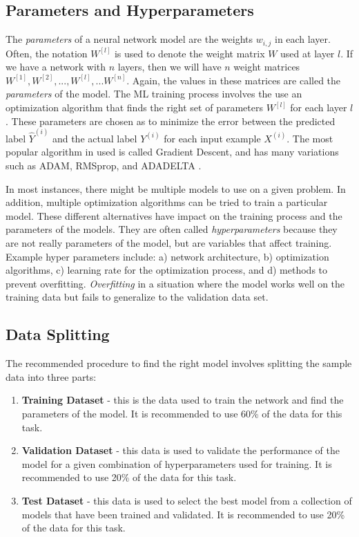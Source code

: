\documentclass[12pt]{report}
\begin{document}
\subsection{Parameters and Hyperparameters}
The {\em parameters} of a neural network model are the weights $w_{i,j}$ in each layer. Often, the notation $W^{[l]}$ is used to denote the weight matrix $W$ used at layer $l$. If we have a network with $n$ layers, then we will have $n$ weight matrices $W^{[1]}, W^{[2]}, ..., W^{[l]}, ...W^{[n]}$.  Again, the values in these matrices are called the {\em parameters} of the model. The \ac{ML} training process
involves the use an optimization algorithm that finds the right set of parameters $W^{[l]}$ for each layer $l$. These parameters are chosen as to minimize the error between the predicted label $\hat{Y}^{(i)}$ and the actual label $Y^{(i)}$ for each input example $X^{(i)}$. The most popular algorithm in used is called Gradient Descent, and has many variations such as ADAM, RMSprop, and ADADELTA \cite{Goodfellow2016}. 

In most instances, there might be multiple models to use on a given problem. In addition, multiple optimization algorithms can be tried to train a particular model. These different alternatives have impact on the training process and the parameters of the models. They are often called {\em hyperparameters} because they are not really parameters of the model, but are variables that affect training. Example hyper parameters include: a) network architecture, 
b) optimization algorithms, c) learning rate for the optimization process, and d) methods to prevent overfitting. {\em Overfitting} in a situation where the model 
works well on the training data but fails to generalize to the validation data set. 

\subsection{Data Splitting} 
The recommended procedure to find the right model involves splitting the sample data into three parts:
\begin{enumerate}
	\item {\bf Training Dataset} - this is the data used to train the network and find the parameters of the model. It is recommended to use 60\% of the data 
	for this task. 
	
	\item {\bf Validation  Dataset} -  this data is used to validate the performance of the model for a given combination of hyperparameters used for training. It is recommended to use 20\% of the data for this task. 
	
	
	\item {\bf Test Dataset} - this data is used to select the best model from a collection of models that have been trained and validated. 
	It is recommended to use 20\% of the data for this task. 
\end{enumerate} 
\end{document}
